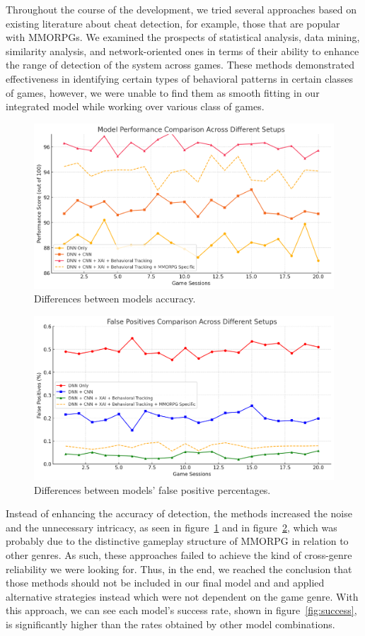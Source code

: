 Throughout the course of the development, we tried several approaches based on existing literature about cheat detection, for example, those that are popular with MMORPGs. We examined the prospects of statistical analysis, data mining, similarity analysis, and network-oriented ones in terms of their ability to enhance the range of detection of the system across games. These methods demonstrated effectiveness in identifying certain types of behavioral patterns in certain classes of games, however, we were unable to find them as smooth fitting in our integrated model while working over various class of games.

\begin{figure}[h]
\centering
\includegraphics[width=0.8\linewidth]{images/model.png}
\captionsetup{width=0.8\textwidth}
\caption{\label{fig:model}Differences between models accuracy.}
\end{figure}

\begin{figure}[h]
\centering
\includegraphics[width=0.8\linewidth]{images/false-positive.png}
\captionsetup{width=0.8\textwidth}
\caption{\label{fig:falsepositive}Differences between models' false positive percentages.}
\end{figure}

Instead of enhancing the accuracy of detection, the methods increased the noise and the unnecessary intricacy, as seen in figure~\ref{fig:model} and in figure~\ref{fig:falsepositive}, which was probably due to the distinctive gameplay structure of MMORPG in relation to other genres. As such, these approaches failed to achieve the kind of cross-genre reliability we were looking for. Thus, in the end, we reached the conclusion that those methods should not be included in our final model and and applied alternative strategies instead which were not dependent on the game genre. With this approach, we can see each model's success rate, shown in figure~\ref{fig:success}, is significantly higher than the rates obtained by other model combinations.

